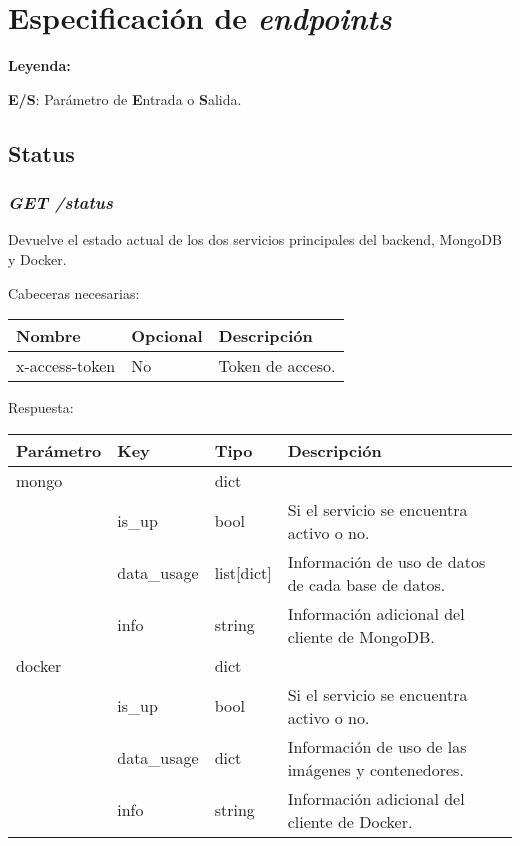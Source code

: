\chapter{Especificación de \textit{endpoints}}

\textbf{Leyenda:}

\textbf{E/S}: Parámetro de \textbf{E}ntrada o \textbf{S}alida.


\section{Status}

\subsection{\textit{GET /status}}
Devuelve el estado actual de los dos servicios principales del backend, MongoDB y Docker.

Cabeceras necesarias:
\begin{table}[h!]
	\centering
	\begin{tabular}{|l|l|l|}
		\hline
		Nombre & Opcional & Descripción \\ \hline
		x-access-token & No & Token de acceso. \\ \hline
	\end{tabular}
\end{table}

Respuesta:
\begin{table}[!h]
	\centering
	\begin{adjustbox}{max width=\textwidth}
	\begin{tabular}{|l|l|l|l|}
		\hline
		Parámetro & Key & Tipo & Descripción \\ \hline
		mongo &  & dict &  \\ \hline
		& is\_up & bool & Si el servicio se encuentra activo o no. \\ \hline
		& data\_usage & list[dict] & Información de uso de datos de cada base de datos. \\ \hline
		& info & string & Información adicional del cliente de MongoDB. \\ \hline
		docker &  & dict &  \\ \hline
		& is\_up & bool & Si el servicio se encuentra activo o no. \\ \hline
		& data\_usage & dict & Información de uso de las imágenes y contenedores. \\ \hline
		& info & string & Información adicional del cliente de Docker. \\ \hline
	\end{tabular}
	\end{adjustbox}
\end{table}

